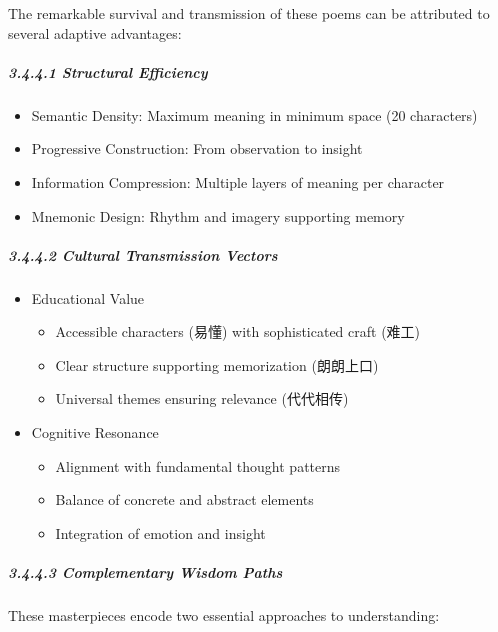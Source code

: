 The remarkable survival and transmission of these poems can be
attributed to several adaptive advantages:

\hypertarget{structural-efficiency}{%
\subparagraph{3.4.4.1 Structural
Efficiency}\label{structural-efficiency}}

\begin{itemize}
\tightlist
\item
  Semantic Density: Maximum meaning in minimum space (20 characters)
\item
  Progressive Construction: From observation to insight
\item
  Information Compression: Multiple layers of meaning per character
\item
  Mnemonic Design: Rhythm and imagery supporting memory
\end{itemize}

\hypertarget{cultural-transmission-vectors}{%
\subparagraph{3.4.4.2 Cultural Transmission
Vectors}\label{cultural-transmission-vectors}}

\begin{itemize}
\tightlist
\item
  Educational Value

  \begin{itemize}
  \tightlist
  \item
    Accessible characters (易懂) with sophisticated craft (难工)
  \item
    Clear structure supporting memorization (朗朗上口)
  \item
    Universal themes ensuring relevance (代代相传)
  \end{itemize}
\item
  Cognitive Resonance

  \begin{itemize}
  \tightlist
  \item
    Alignment with fundamental thought patterns
  \item
    Balance of concrete and abstract elements
  \item
    Integration of emotion and insight
  \end{itemize}
\end{itemize}

\hypertarget{complementary-wisdom-paths}{%
\subparagraph{3.4.4.3 Complementary Wisdom
Paths}\label{complementary-wisdom-paths}}

These masterpieces encode two essential approaches to understanding:

